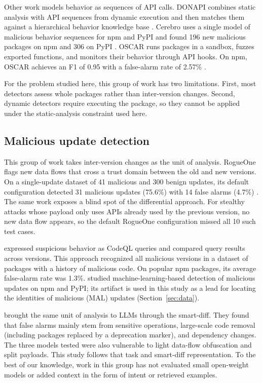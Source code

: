 \documentclass[a4paper,fleqn]{cas-dc}
\begin{document}
Other work models behavior as sequences of API calls. DONAPI combines static
analysis with API sequences from dynamic execution and then matches them against
a hierarchical behavior knowledge base \citep{huang2024donapi}. Cerebro uses a
single model of malicious behavior sequences for npm and PyPI and found 196 new
malicious packages on npm and 306 on PyPI \citep{zhang2025killing}. OSCAR runs
packages in a sandbox, fuzzes exported functions, and monitors
their behavior through API hooks. On npm, OSCAR achieves an F1 of 0.95
with a false-alarm rate of 2.57\% \citep{zheng2024towards}.

For the problem studied here, this group of work has two limitations. First,
most detectors assess whole packages rather than inter-version changes. Second,
dynamic detectors require executing the package, so they cannot be applied under
the static-analysis constraint used here.

\subsection{Malicious update detection}
This group of work takes inter-version changes as the unit of analysis.
RogueOne flags new data flows that cross a trust domain between the old
and new versions. On a single-update dataset of 41 malicious and 300 benign
updates, its default configuration detected 31 malicious updates (75.6\%) with
14 false alarms (4.7\%) \citep{sofaer2024rogueone}. The same work exposes a blind
spot of the differential approach. For stealthy attacks whose payload only uses
APIs already used by the previous version, no new data flow appears, so the
default RogueOne configuration missed all 10 such test cases.

\citet{froh2023differential} expressed suspicious behavior as CodeQL queries and
compared query results across versions. This approach recognized all malicious
versions in a dataset of packages with a history of malicious code. On popular
npm packages, its average false-alarm rate was 1.3\%. \citet{draz2026version}
studied machine-learning-based detection of malicious updates on npm and PyPI;
its artifact is used in this study as a lead for locating the identities of
malicious (MAL) updates (Section~\ref{sec:data}).

\citet{wyss2025evaluating} brought the same unit of analysis to LLMs through the
smart-diff. They found that false alarms mainly stem from sensitive
operations, large-scale code removal (including packages replaced by a
deprecation marker), and dependency changes. The three models tested were
also vulnerable to light data-flow obfuscation and split payloads. This study
follows that task and smart-diff representation. To the best of our knowledge,
work in this group has not evaluated small open-weight models or added
context in the form of intent or retrieved examples.
\end{document}
